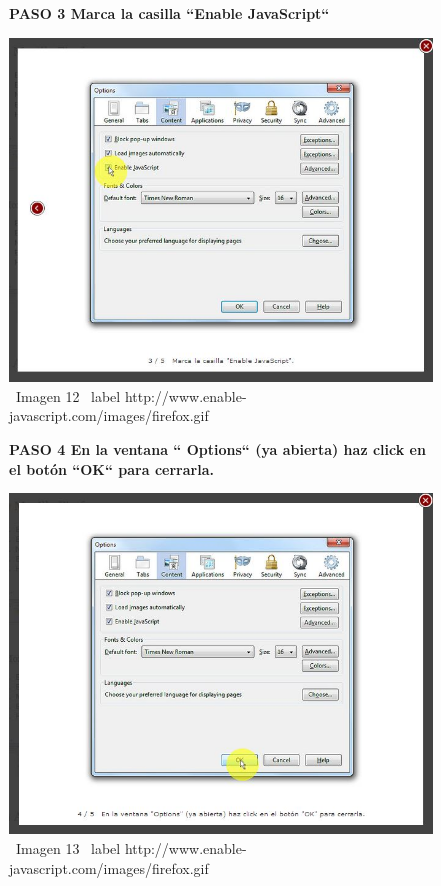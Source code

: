 \documentclass[11pt]{article} %
\begin{document}
\begin{figure}
\begin{center}

\begin{center}
\bf PASO 3
Marca la casilla ``Enable JavaScript``
\newline
\end{center}
\includegraphics[height=8 cm, width=8 cm] {imagenes/firefox 03.jpg}
\newline
\newline
\ Imagen 12
\ label {http://www.enable-javascript.com/images/firefox.gif }

\begin{center}
\bf PASO 4
En la ventana `` Options`` (ya abierta) haz click en el botón ``OK`` para cerrarla.
\end{center}
\includegraphics[height=8 cm, width=8 cm] {imagenes/firefox 04.jpg}
\newline
\newline
\ Imagen 13
\ label {http://www.enable-javascript.com/images/firefox.gif }

\end{center}
\end{figure}
\end{document}
